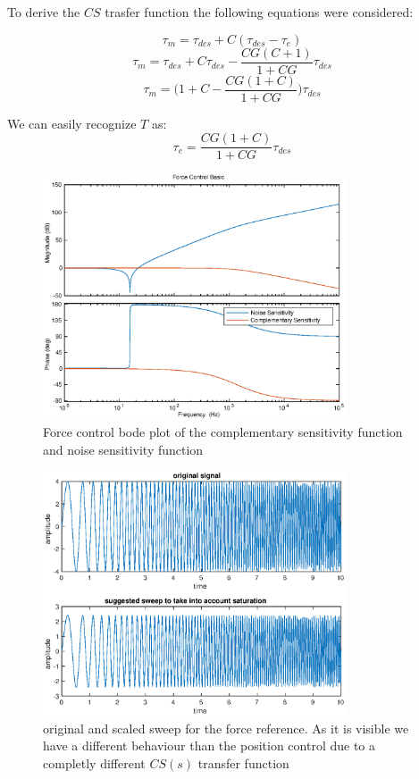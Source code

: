 \documentclass[a4paper,11pt]{article}
\begin{document}
\bigskip
\noindent To derive the $CS$ trasfer function the following equations were considered:

\[
  \tau_m = \tau_{des} + C(\tau_{des} - \tau_e)
\]
\[
  \tau_m = \tau_{des} + C\tau_{des} - \frac{CG(C+1)}{1+CG}\tau_{des}
\]
\[
  \tau_m = \bigg(1 + C - \frac{CG(1+C)}{1+CG}\bigg)\tau_{des}
\]

We can easily recognize $T$ as:
\[
  \tau_e = \frac{CG(1+C)}{1+CG}\tau_{des}
\]

\bigskip
\begin{figure}[H]
\begin{center}
\includegraphics[width=0.8\textwidth]{images/force_tf.eps}
\end{center}
\caption{Force control bode plot of the complementary sensitivity function and noise sensitivity function}
\label{fig:force_tf}
\end{figure}


\begin{figure}[H]
\begin{center}
\includegraphics[width=0.8\textwidth]{images/force_scaled.eps}
\end{center}
\caption{original and scaled sweep for the force reference. As it is visible we have a different behaviour than the position control due to a completly different $CS(s)$ transfer function}
\label{fig:force_ref}
\end{figure}
\end{document}
